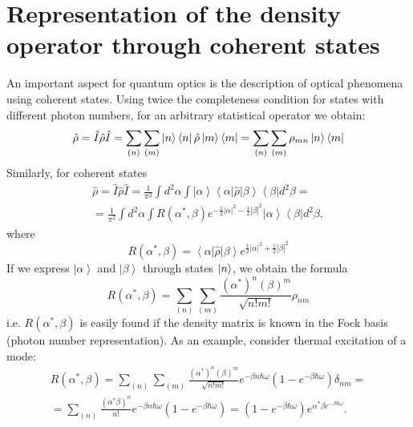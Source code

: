 \section{Representation of the density operator through coherent
  states}
An important aspect for quantum optics is the description of optical phenomena using coherent states. Using twice the completeness condition for states with different photon numbers, for an arbitrary statistical operator we obtain: 
\[
\hat{\rho} = \hat{I}\hat{\rho}\hat{I} = 
\sum_{(n)}\sum_{(m)}
\ket{n}\bra{n}\hat{\rho}\ket{m}\bra{m} = 
\sum_{(n)}\sum_{(m)} \rho_{mn}\ket{n}\bra{m}
\]
Similarly, for coherent states
\begin{eqnarray}
\hat{\rho} = \hat{I}\hat{\rho}\hat{I} = 
\frac{1}{\pi^2}\int d^2\alpha\int
\left|\alpha\right>\left<\alpha\right|\hat{\rho}\left|\beta\right>\left<\beta\right|
d^2 \beta = 
\nonumber \\
= \frac{1}{\pi^2} \int d^2\alpha \int
R\left(\alpha^{*}, \beta\right) e^{-\frac{1}{2}\left|\alpha\right|^2 -\frac{1}{2}\left|\beta\right|^2}
\left|\alpha\right>\left<\beta\right|d^2 \beta ,
\end{eqnarray}
where
\[
R\left(\alpha^{*}, \beta\right) =
\left<\alpha\right|\hat{\rho}\left|\beta\right>
e^{\frac{1}{2}\left|\alpha\right|^2 +\frac{1}{2}\left|\beta\right|^2}
\]
If we express $\left|\alpha\right>$ and $\left|\beta\right>$ through
states $\ket{n}$,  we obtain the formula 
\begin{equation}
R\left(\alpha^{*}, \beta\right) = \sum_{(n)}\sum_{(m)}
\frac{\left(\alpha^{*}\right)^n \left(\beta\right)^m}{\sqrt{n!m!}}\rho_{nm}
\end{equation}
i.e. $R\left(\alpha^{*}, \beta\right)$ is easily found if the density matrix 
is known in the Fock basis (photon number representation). As an example, consider thermal excitation of a mode: 
\begin{eqnarray}
R\left(\alpha^{*}, \beta\right) = \sum_{(n)}\sum_{(m)}
\frac{\left(\alpha^{*}\right)^n \left(\beta\right)^m}{\sqrt{n!m!}}
e^{-\beta n \hbar \omega}\left(1  -  e^{-\beta \hbar \omega}\right)
\delta_{nm} = 
\nonumber \\
= \sum_{(n)}\frac{\left(\alpha^{*} \beta\right)^n }{n!}
e^{-\beta n \hbar \omega}\left(1  -  e^{-\beta \hbar \omega}\right) =
\left(1  -  e^{-\beta \hbar \omega}\right) e^{\alpha^{*}\beta
  e^{-\beta \hbar \omega}}.
\end{eqnarray}

